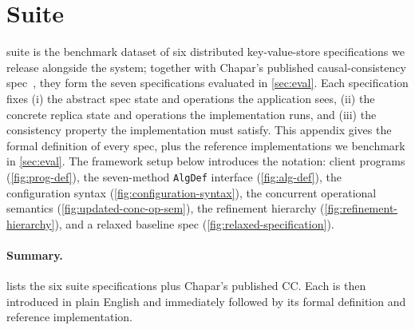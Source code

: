 \clearpage
\section{\sys{} Suite}
\label{app:suite}

\sys{} suite is the benchmark dataset of six distributed key-value-store specifications we release alongside the system; together with Chapar's published causal-consistency spec~\cite{chapar}, they form the seven specifications evaluated in \cref{sec:eval}. Each specification fixes (i) the abstract spec state and operations the application sees, (ii) the concrete replica state and operations the implementation runs, and (iii) the consistency property the implementation must satisfy. This appendix gives the formal definition of every spec, plus the reference implementations we benchmark in \cref{sec:eval}. The framework setup below introduces the notation: client programs (\cref{fig:prog-def}), the seven-method \texttt{AlgDef} interface (\cref{fig:alg-def}), the configuration syntax (\cref{fig:configuration-syntax}), the concurrent operational semantics (\cref{fig:updated-conc-op-sem}), the refinement hierarchy (\cref{fig:refinement-hierarchy}), and a relaxed baseline spec (\cref{fig:relaxed-specification}).

\paragraph{Summary.}
 lists the six \sys{} suite specifications plus Chapar's published CC. Each is then introduced in plain English and immediately followed by its formal definition and reference implementation.

